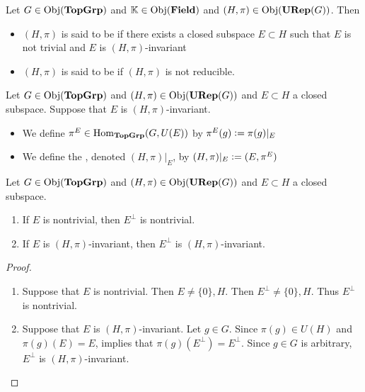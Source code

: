 \documentclass{book}
\begin{document}
	\begin{defn}
		Let $G \in \operatorname{Obj}(\operatorname*{\text{\textbf{TopGrp}}})$ and $\mathbb{K} \in \operatorname{Obj}(\operatorname*{\text{\textbf{Field}}})$ and $(H, \pi) \in \operatorname{Obj}(\operatorname*{\text{\textbf{URep}}}(G))$. Then 
		\begin{itemize}
			\item $(H, \pi)$ is said to be  if there exists a closed subspace $E \subset H$ such that $E$ is not trivial and $E$ is $(H, \pi)$-invariant 
			\item $(H, \pi)$ is said to be  if $(H, \pi)$ is not reducible.
		\end{itemize}
	\end{defn}
	
	\begin{defn}
		Let $G \in \operatorname{Obj}(\operatorname*{\text{\textbf{TopGrp}}})$ and $(H, \pi) \in \operatorname{Obj}(\operatorname*{\text{\textbf{URep}}}(G))$ and $E \subset H$ a closed subspace. Suppose that $E$ is $(H, \pi)$-invariant. 
		\begin{itemize}
			\item We define $\pi^E \in \operatorname{Hom}_{\operatorname*{\text{\textbf{TopGrp}}}}(G, U(E))$ by $\pi^E(g) \vcentcolon= \pi(g)|_E$
			\item We define the , denoted $(H, \pi)|_E$, by $(H, \pi)|_E \vcentcolon= (E, \pi^E)$
		\end{itemize}
	\end{defn}
	
	\begin{ex}
		Let $G \in \operatorname{Obj}(\operatorname*{\text{\textbf{TopGrp}}})$ and $(H, \pi) \in \operatorname{Obj}(\operatorname*{\text{\textbf{URep}}}(G))$ and $E \subset H$ a closed subspace. 
		\begin{enumerate}
			\item If $E$ is nontrivial, then $E^{\perp}$ is nontrivial.
			\item If $E$ is $(H, \pi)$-invariant, then $E^{\perp}$ is  $(H, \pi)$-invariant.  
		\end{enumerate}
	\end{ex}
	
	\begin{proof}\
		\begin{enumerate}
			\item Suppose that $E$ is nontrivial. Then $E \neq \{0\}, H$. Then $E^{\perp} \neq \{0\}, H$. Thus $E^{\perp}$ is nontrivial.
			\item Suppose that $E$ is $(H, \pi)$-invariant. Let $g \in G$. Since $\pi(g) \in U(H)$ and $\pi(g)(E) = E$,  implies that $\pi(g)(E^{\perp}) = E^{\perp}$. Since $g \in G$ is arbitrary, $E^{\perp}$ is $(H, \pi)$-invariant. 
		\end{enumerate}
	\end{proof}
	
\end{document}
